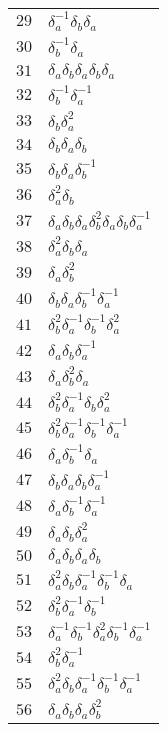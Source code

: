 \documentclass{article}
\begin{document}
\begin{center}
\begin{tabular}{ll}
$29$ & $\delta_a^{-1}\delta_b^{}\delta_a^{}$ \\
$30$ & $\delta_b^{-1}\delta_a^{}$ \\
$31$ & $\delta_a^{}\delta_b^{}\delta_a^{}\delta_b^{}\delta_a^{}$ \\
$32$ & $\delta_b^{-1}\delta_a^{-1}$ \\
$33$ & $\delta_b^{}\delta_a^{2}$ \\
$34$ & $\delta_b^{}\delta_a^{}\delta_b^{}$ \\
$35$ & $\delta_b^{}\delta_a^{}\delta_b^{-1}$ \\
$36$ & $\delta_a^{2}\delta_b^{}$ \\
$37$ & $\delta_a^{}\delta_b^{}\delta_a^{}\delta_b^{2}\delta_a^{}\delta_b^{}\delta_a^{-1}$ \\
$38$ & $\delta_a^{2}\delta_b^{}\delta_a^{}$ \\
$39$ & $\delta_a^{}\delta_b^{2}$ \\
$40$ & $\delta_b^{}\delta_a^{}\delta_b^{-1}\delta_a^{-1}$ \\
$41$ & $\delta_b^{2}\delta_a^{-1}\delta_b^{-1}\delta_a^{2}$ \\
$42$ & $\delta_a^{}\delta_b^{}\delta_a^{-1}$ \\
$43$ & $\delta_a^{}\delta_b^{2}\delta_a^{}$ \\
$44$ & $\delta_b^{2}\delta_a^{-1}\delta_b^{}\delta_a^{2}$ \\
$45$ & $\delta_b^{2}\delta_a^{-1}\delta_b^{-1}\delta_a^{-1}$ \\
$46$ & $\delta_a^{}\delta_b^{-1}\delta_a^{}$ \\
$47$ & $\delta_b^{}\delta_a^{}\delta_b^{}\delta_a^{-1}$ \\
$48$ & $\delta_a^{}\delta_b^{-1}\delta_a^{-1}$ \\
$49$ & $\delta_a^{}\delta_b^{}\delta_a^{2}$ \\
$50$ & $\delta_a^{}\delta_b^{}\delta_a^{}\delta_b^{}$ \\
$51$ & $\delta_a^{2}\delta_b^{}\delta_a^{-1}\delta_b^{-1}\delta_a^{}$ \\
$52$ & $\delta_b^{2}\delta_a^{-1}\delta_b^{-1}$ \\
$53$ & $\delta_a^{-1}\delta_b^{-1}\delta_a^{2}\delta_b^{-1}\delta_a^{-1}$ \\
$54$ & $\delta_b^{2}\delta_a^{-1}$ \\
$55$ & $\delta_a^{2}\delta_b^{}\delta_a^{-1}\delta_b^{-1}\delta_a^{-1}$ \\
$56$ & $\delta_a^{}\delta_b^{}\delta_a^{}\delta_b^{2}$ \\

\end{tabular}
\end{center}
\end{document}
